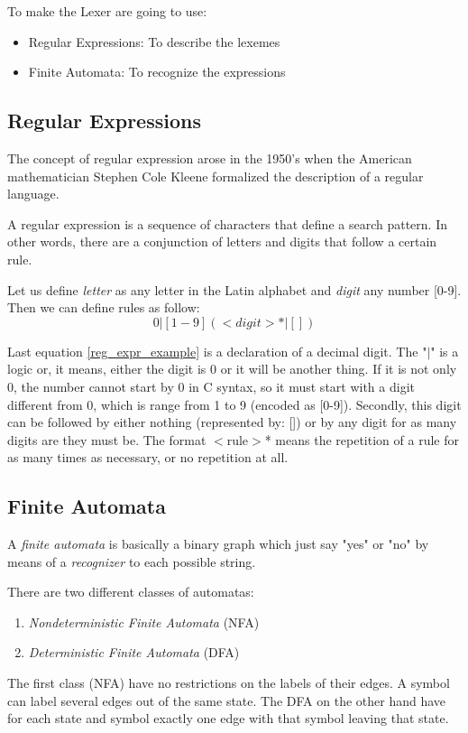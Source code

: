 \documentclass[conference]{IEEEtran}
\theoremstyle{definition}
\begin{document}
To make the Lexer are going to use:
\begin{itemize}
	\item Regular Expressions: To describe the lexemes
	\item Finite Automata: To recognize the expressions
\end{itemize}
\subsection{Regular Expressions}
The concept of regular expression arose in the 1950's when the American mathematician Stephen Cole Kleene formalized the description of a regular language.

A regular expression is a sequence of characters that define a search pattern. In other words, there are a conjunction of letters and digits that follow a certain rule.

Let us define \textit{letter} as any letter in the Latin alphabet and \textit{digit} any number [0-9]. Then we can define rules as follow:
\begin{equation}
0 | [1-9] (<digit>* | [])\label{reg_expr_example}
\end{equation}

Last equation \ref{reg_expr_example} is a declaration of a decimal digit. The "$|$" is a logic or, it means, either the digit is 0 or it will be another thing. If it is not only 0, the number cannot start by 0 in C syntax, so it must start with a digit different from 0, which is range from 1 to 9 (encoded as [0-9]). Secondly, this digit can be followed by either nothing (represented by: []) or by any digit for as many digits are they must be. The format $<$rule$>$* means the repetition of a rule for as many times as necessary, or no repetition at all.

\subsection{Finite Automata}
A \textit{finite automata} is basically a binary graph which just say "yes" or "no" by means of a \textit{recognizer} to each possible string.

There are two different classes of automatas:
\begin{enumerate}
	\item \textit{Nondeterministic Finite Automata} (NFA)
	\item \textit{Deterministic Finite Automata} (DFA)
\end{enumerate}
The first class (NFA) have no restrictions on the labels of their edges. A symbol can label several edges out of the same state. The DFA on the other hand have for each state and symbol exactly one edge with that symbol leaving that state.
\end{document}
